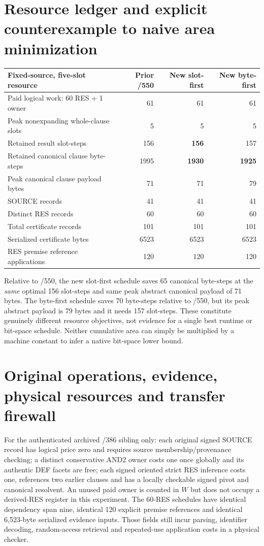 \documentclass[11pt]{article}
\begin{document}
\section*{Resource ledger and explicit counterexample to naive area minimization}
\begin{center}
\begin{tabular}{lrrr}
\toprule
Fixed-source, five-slot resource & Prior /550 & New slot-first & New byte-first\\
\midrule
Paid logical work: 60 RES + 1 owner &61&61&61\\
Peak nonexpanding whole-clause slots &5&5&5\\
Retained result slot-steps &156&\textbf{156}&157\\
Retained canonical clause byte-steps &1995&\textbf{1930}&\textbf{1925}\\
Peak canonical clause payload bytes &71&71&79\\
SOURCE records &41&41&41\\
Distinct RES records &60&60&60\\
Total certificate records &101&101&101\\
Serialized certificate bytes &6523&6523&6523\\
RES premise reference applications &120&120&120\\
\bottomrule
\end{tabular}
\end{center}
Relative to /550, the new slot-first schedule saves 65 canonical byte-steps at the \emph{same} optimal 156 slot-steps and same peak abstract canonical payload of 71 bytes. The byte-first schedule saves 70 byte-steps relative to /550, but its peak abstract payload is 79 bytes and it needs 157 slot-steps. These constitute genuinely different resource objectives, not evidence for a single best runtime or bit-space schedule. Neither cumulative area can simply be multiplied by a machine constant to infer a native bit-space lower bound.

\section*{Original operations, evidence, physical resources and transfer firewall}
For the authenticated archived /386 sibling only: each original signed SOURCE record has logical price zero and requires source membership/provenance checking; a distinct conservative AND2 owner costs one once globally and its authentic DEF facets are free; each signed oriented strict RES inference costs one, references two earlier clauses and has a locally checkable signed pivot and canonical resolvent. An unused paid owner is counted in $W$ but does not occupy a derived-RES register in this experiment. The 60-RES schedules have identical dependency span nine, identical 120 explicit premise references and identical 6,523-byte serialized evidence inputs. Those fields still incur parsing, identifier decoding, random-access retrieval and repeated-use application costs in a physical checker.
\end{document}
